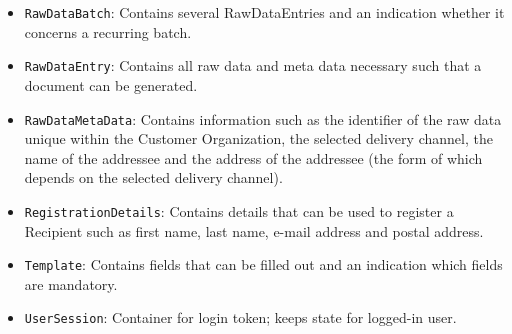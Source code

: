 \begin{itemize}
    \item \texttt{RawDataBatch}: Contains several RawDataEntries and an indication whether it concerns a recurring batch. 
    \item \texttt{RawDataEntry}: Contains all raw data and meta data necessary such that a document can be generated.
    \item \texttt{RawDataMetaData}: Contains information such as the identifier of the raw data unique within the Customer Organization, the selected delivery channel, the name of the addressee and the address of the addressee (the form of which depends on the selected delivery channel).
    \item \texttt{RegistrationDetails}: Contains details that can be used to register a Recipient such as first name, last name, e-mail address and postal address.
    \item \texttt{Template}: Contains fields that can be filled out and an indication which fields are mandatory.
    \item \texttt{UserSession}: Container for login token; keeps state for logged-in user.
\end{itemize}